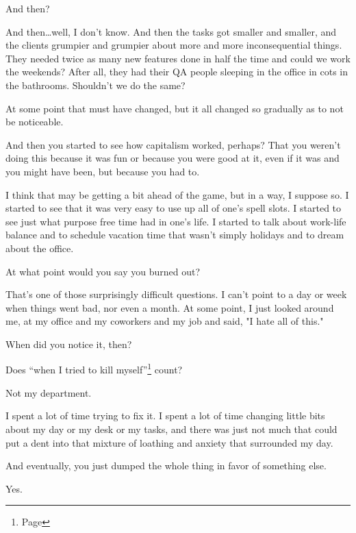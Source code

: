 \begin{paracol}{2}
\begin{leftcolumn}
\begin{ally}
And then?
\end{ally}
And then\ldots{}well, I don't know. And then the tasks got smaller and smaller, and the clients grumpier and grumpier about more and more inconsequential things. They needed twice as many new features done in half the time and could we work the weekends? After all, they had their QA people sleeping in the office in cots in the bathrooms. Shouldn't we do the same?

At some point that must have changed, but it all changed so gradually as to not be noticeable.

\begin{ally}
And then you started to see how capitalism worked, perhaps? That you weren't doing this because it was fun or because you were good at it, even if it was and you might have been, but because you had to.
\end{ally}
I think that may be getting a bit ahead of the game, but in a way, I suppose so. I started to see that it was very easy to use up all of one's spell slots. I started to see just what purpose free time had in one's life. I started to talk about work-life balance and to schedule vacation time that wasn't simply holidays and to dream about the office.

\newpage

\begin{ally}
At what point would you say you burned out?
\end{ally}
That's one of those surprisingly difficult questions. I can't point to a day or week when things went bad, nor even a month. At some point, I just looked around me, at my office and my coworkers and my job and said, "I hate all of this."

\begin{ally}
When did you notice it, then?
\end{ally}
Does ``when I tried to kill myself''\footnote{Page \pageref{selfharm:suicide}} count?

\begin{ally}
Not my department.
\end{ally}
I spent a lot of time trying to fix it. I spent a lot of time changing little bits about my day or my desk or my tasks, and there was just not much that could put a dent into that mixture of loathing and anxiety that surrounded my day.

\begin{ally}
And eventually, you just dumped the whole thing in favor of something else.
\end{ally}
Yes.


\end{leftcolumn}
\end{paracol}
